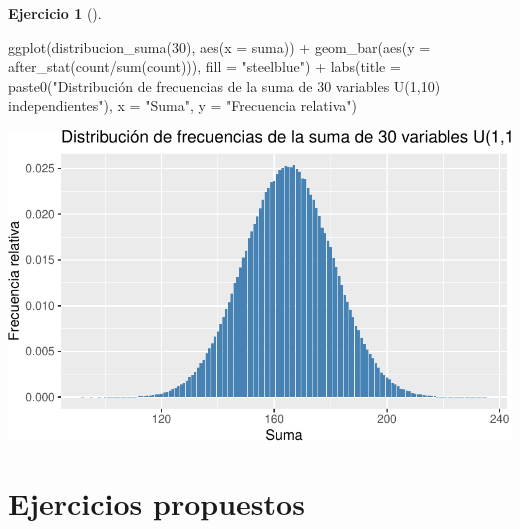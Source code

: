 \documentclass[
  a4paper,
]{scrreport}
\newenvironment{Shaded}{\begin{snugshade}}{\end{snugshade}}
\newcommand{\AttributeTok}[1]{\textcolor[rgb]{0.40,0.45,0.13}{#1}}
\newcommand{\DecValTok}[1]{\textcolor[rgb]{0.68,0.00,0.00}{#1}}
\newcommand{\FunctionTok}[1]{\textcolor[rgb]{0.28,0.35,0.67}{#1}}
\newcommand{\NormalTok}[1]{\textcolor[rgb]{0.00,0.23,0.31}{#1}}
\newcommand{\SpecialCharTok}[1]{\textcolor[rgb]{0.37,0.37,0.37}{#1}}
\newcommand{\StringTok}[1]{\textcolor[rgb]{0.13,0.47,0.30}{#1}}
\theoremstyle{definition}
\newtheorem{exercise}{Ejercicio}[chapter]
\theoremstyle{remark}
\begin{document}
\begin{exercise}[]
\begin{enumerate}
\begin{tcolorbox}
\begin{Shaded}
\begin{Highlighting}[]
\FunctionTok{ggplot}\NormalTok{(}\FunctionTok{distribucion\_suma}\NormalTok{(}\DecValTok{30}\NormalTok{), }\FunctionTok{aes}\NormalTok{(}\AttributeTok{x =}\NormalTok{ suma)) }\SpecialCharTok{+} 
    \FunctionTok{geom\_bar}\NormalTok{(}\FunctionTok{aes}\NormalTok{(}\AttributeTok{y =} \FunctionTok{after\_stat}\NormalTok{(count}\SpecialCharTok{/}\FunctionTok{sum}\NormalTok{(count))), }\AttributeTok{fill =} \StringTok{"steelblue"}\NormalTok{) }\SpecialCharTok{+}
    \FunctionTok{labs}\NormalTok{(}\AttributeTok{title =} \FunctionTok{paste0}\NormalTok{(}\StringTok{"Distribución de frecuencias de la suma de 30 variables U(1,10) independientes"}\NormalTok{), }\AttributeTok{x =} \StringTok{"Suma"}\NormalTok{, }\AttributeTok{y =} \StringTok{"Frecuencia relativa"}\NormalTok{)}
\end{Highlighting}
\end{Shaded}

  \includegraphics{06-distribuciones-probabilidad_files/figure-pdf/unnamed-chunk-35-1.pdf}

  \end{tcolorbox}
\end{enumerate}

\end{exercise}

\section{Ejercicios propuestos}\label{ejercicios-propuestos-4}
\end{document}
